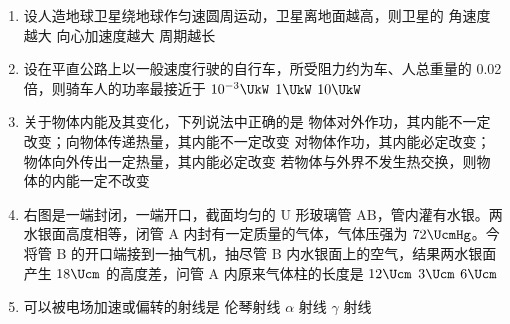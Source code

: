 \documentclass[\gkver]{gaokaozhenti}
\begin{document}
\begin{enumerate}
\item
设人造地球卫星绕地球作匀速圆周运动，卫星离地面越高，则卫星的
{角速度越大}
{向心加速度越大}
{周期越长}

\item
设在平直公路上以一般速度行驶的自行车，所受阻力约为车、人总重量的 0.02 倍，则骑车人的功率最接近于
{$10^{-3}\UkW$}
{$1\UkW$}
{$10\UkW$}

\item
关于物体内能及其变化，下列说法中正确的是
{物体对外作功，其内能不一定改变；向物体传递热量，其内能不一定改变}
{对物体作功，其内能必定改变；物体向外传出一定热量，其内能必定改变}
{若物体与外界不发生热交换，则物体的内能一定不改变}

\item
右图是一端封闭，一端开口，截面均匀的 U 形玻璃管 AB，管内灌有水银。两水银面高度相等，闭管 A 内封有一定质量的气体，气体压强为 $72\UcmHg$。今将管 B 的开口端接到一抽气机，抽尽管 B 内水银面上的空气，结果两水银面产生 $18\Ucm$ 的高度差，问管 A 内原来气体柱的长度是
\onepicture[w=2.60cm]{}
\fourchoices[answer=C]
{$18\Ucm$}
{$12\Ucm$}
{$3\Ucm$}
{$6\Ucm$}

\item
可以被电场加速或偏转的射线是
{伦琴射线}
{$\alpha$ 射线}
{$\gamma$ 射线}


\end{enumerate}
\end{document}
